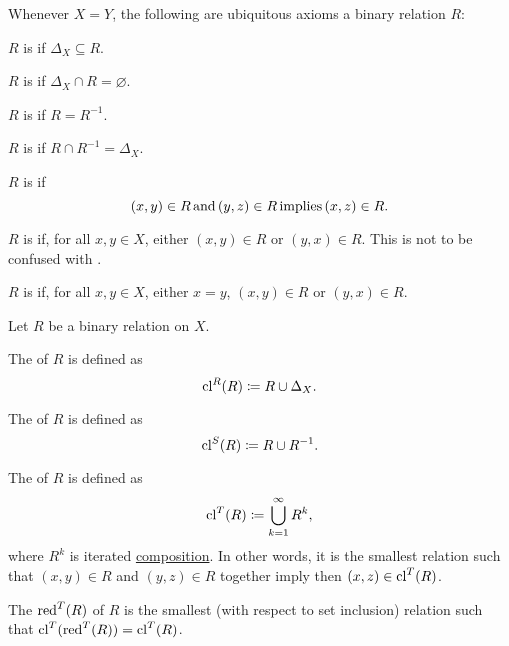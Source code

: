 \begin{definition}
  Whenever \( X = Y \), the following are ubiquitous axioms a binary relation \( R \):
  \begin{thmenum}[resume=def:binary_relation]
     \( R \) is  if \( \Delta_X \subseteq R \).

     \( R \) is  if \( \Delta_X \cap R = \varnothing \).

     \( R \) is  if \( R = R^{-1} \).

     \( R \) is  if \( R \cap R^{-1} = \Delta_X \).

     \( R \) is  if
    \begin{equation*}
      (x, y) \in R \T{and} (y, z) \in R \T{implies} (x, z) \in R.
    \end{equation*}

     \( R \) is  if, for all \( x, y \in X \), either \( (x, y) \in R \) or \( (y, x) \in R \). This is not to be confused with .

     \( R \) is  if, for all \( x, y \in X \), either \( x = y \), \( (x, y) \in R \) or \( (y, x) \in R \).
  \end{thmenum}
\end{definition}

\begin{definition}\label{def:derived_relations}
  Let \( R \) be a binary relation on \( X \).

  \begin{thmenum}
     The  of \( R \) is defined as
    \begin{equation*}
      \operatorname{cl}^R(R) \coloneqq R \cup \Delta_X.
    \end{equation*}

     The  of \( R \) is defined as
    \begin{equation*}
      \operatorname{cl}^S(R) \coloneqq R \cup R^{-1}.
    \end{equation*}

     The  of \( R \) is defined as
    \begin{equation*}
      \operatorname{cl}^T(R) \coloneqq \bigcup_{k=1}^\infty R^k,
    \end{equation*}
    where \( R^k \) is iterated \hyperref[def:binary_relation/composition]{composition}. In other words, it is the smallest relation such that \( (x, y) \in R \) and \( (y, z) \in R \) together imply then \( (x, z) \in \operatorname{cl}^T(R) \).

    The  \( \operatorname{red}^T(R) \) of \( R \) is the smallest (with respect to set inclusion) relation such that \( \operatorname{cl}^T(\operatorname{red}^T(R)) = \operatorname{cl}^T(R) \).
  \end{thmenum}
\end{definition}

